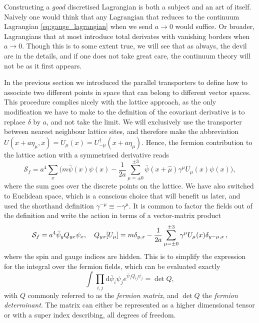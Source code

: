 Constructing a \emph{good} discretised Lagrangian is both a subject and an art
of itself. Naively one would think that any Lagrangian that reduces to the
continuum Lagrangian \eqref{eq:gauge_lagrangian} when we send $a \to 0$ would
suffice. Or broader, Lagrangians that at most introduce total derivates with 
vanishing borders when $a \to 0$. Though this is to some extent true, we will
see that as always, the devil are in the details, and if one does not take great
care, the continuum theory will not be as it first appears.

In the previous section we introduced the parallel transporters to define how to
associate two different points in space that can belong to different vector
spaces. This procedure complies nicely with the lattice approach, as the only modification we
have to make to the definition of the covariant derivative is to
replace $\delta$ by $a$, and not take the limit. We will exclusively use the
transporter between nearest neighbour lattice sites, and therefore make the
abbreviation $U(x + a \eta_\mu, x) = U_{\mu}(x) =
U_{-\mu}^{\dagger}(x+a\eta_{\mu})$. Hence, the fermion contribution to the
lattice action with a symmetrised derivative reads
%
\begin{equation} \label{eq:naive_fermions}
  \mathcal{S}_f = a^4 \sum_x \Big( 
    m \bar{\psi}(x)\psi(x) - 
    \frac{1}{2a}\sum_{\mu=\pm 0}^{\pm 3}
    \bar{\psi}(x+\hat{\mu})\gamma^{\mu}U_{\mu}(x) \psi(x) \bigg),
\end{equation}
%
where the sum goes over the discrete points on the lattice. We have also
switched to Euclidean space, which is a conscious choice that will benefit us
later, and used the shorthand definition $\gamma^{-\mu} \equiv -\gamma^{\mu}$.
It is common to factor the fields out of the definition and write the action in
terms of a vector-matrix product
%
\begin{equation}
  \mathcal{S}_f = a^4 \bar{\psi}_y Q_{yx} \psi_x, \hskip1em 
  Q_{yx}[U_{\mu}] = m \delta_{y,x} - \frac{1}{2a} \sum_{\mu=\pm 0}^{\pm 3} \gamma^{\mu}
    U_{\mu}(x) \delta_{y-\mu,x} \,,
\end{equation}
%
where the spin and gauge indices are hidden.  This is to simplify the expression
for the integral over the fermion fields, which can be evaluated exactly
%
\begin{equation} \label{eq:fermion-integral}
  \int \prod_{i,j} \mathrm{d} \bar{\psi}_i \psi_j e^{\bar{\psi}_i Q_{ij} \psi_j}
   = \det Q,
\end{equation}
%
with $Q$ commonly referred to as the \emph{fermion matrix}, and $\det Q$ the
\emph{fermion determinant}. The matrix can either be represented as a higher
dimensional tensor or with a super index describing, all degrees of freedom.

